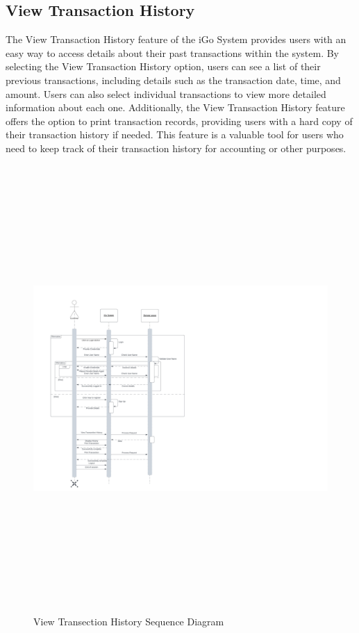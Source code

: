\documentclass[a4paper, 11pt]{report}
\begin{document}
\subsection{View Transaction History}
The View Transaction History feature of the iGo System provides users with an easy way to access details about their past transactions within the system. By selecting the View Transaction History option, users can see a list of their previous transactions, including details such as the transaction date, time, and amount. Users can also select individual transactions to view more detailed information about each one. Additionally, the View Transaction History feature offers the option to print transaction records, providing users with a hard copy of their transaction history if needed. This feature is a valuable tool for users who need to keep track of their transaction history for accounting or other purposes. 
\begin{figure}[h]
    \renewcommand{\thefigure}{7.2.4}
    \hspace{1cm}
    \includegraphics[scale=0.5,height=17cm]{ViewTransectionHistory.jpeg}
    \caption{View Transection History Sequence Diagram}
\end{figure}
\clearpage
\end{document}
